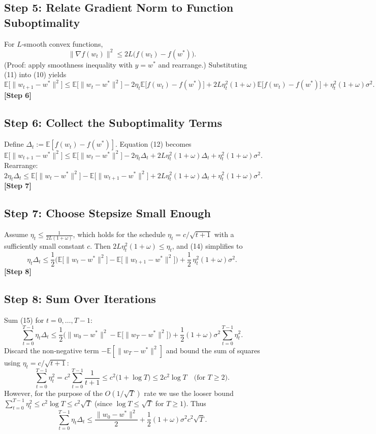 \documentclass{article}
\newcommand{\E}{\mathbb{E}}
\begin{document}
\subsection*{Step 5: Relate Gradient Norm to Function Suboptimality}
For $L$‑smooth convex functions,
\[
\|\nabla f(w_{t})\|^{2}\le 2L\big(f(w_{t})-f(w^{*})\big). \tag{11}
\]
(Proof: apply smoothness inequality with $y=w^{*}$ and rearrange.)  
Substituting (11) into (10) yields
\[
\E\!\big[\|w_{t+1}-w^{*}\|^{2}\big]
\le \E\!\big[\|w_{t}-w^{*}\|^{2}\big]
-2\eta_{t}\E\!\big[f(w_{t})-f(w^{*})\big]
+2L\eta_{t}^{2}(1+\omega)\E\!\big[f(w_{t})-f(w^{*})\big]
+ \eta_{t}^{2}(1+\omega)\sigma^{2}. \tag{12}
\]
\textbf{[Step 6]}

\subsection*{Step 6: Collect the Suboptimality Terms}
Define $\Delta_{t}:=\E[f(w_{t})-f(w^{*})]$.  
Equation (12) becomes
\[
\E\!\big[\|w_{t+1}-w^{*}\|^{2}\big]
\le \E\!\big[\|w_{t}-w^{*}\|^{2}\big]
-2\eta_{t}\Delta_{t}+2L\eta_{t}^{2}(1+\omega)\Delta_{t}
+\eta_{t}^{2}(1+\omega)\sigma^{2}. \tag{13}
\]
Rearrange:
\[
2\eta_{t}\Delta_{t}
\le \E\!\big[\|w_{t}-w^{*}\|^{2}\big]-\E\!\big[\|w_{t+1}-w^{*}\|^{2}\big]
+2L\eta_{t}^{2}(1+\omega)\Delta_{t}
+\eta_{t}^{2}(1+\omega)\sigma^{2}. \tag{14}
\]
\textbf{[Step 7]}

\subsection*{Step 7: Choose Stepsize Small Enough}
Assume $\eta_{t}\le \frac{1}{2L(1+\omega)}$, which holds for the schedule $\eta_{t}=c/\sqrt{t+1}$ with a sufficiently small constant $c$.  
Then $2L\eta_{t}^{2}(1+\omega)\le \eta_{t}$, and (14) simplifies to
\[
\eta_{t}\Delta_{t}
\le \frac12\Big(\E\!\big[\|w_{t}-w^{*}\|^{2}\big]-\E\!\big[\|w_{t+1}-w^{*}\|^{2}\big]\Big)
+\frac12\,\eta_{t}^{2}(1+\omega)\sigma^{2}. \tag{15}
\]
\textbf{[Step 8]}

\subsection*{Step 8: Sum Over Iterations}
Sum (15) for $t=0,\dots,T-1$:
\[
\sum_{t=0}^{T-1}\eta_{t}\Delta_{t}
\le \frac12\Big(\|w_{0}-w^{*}\|^{2}-\E\!\big[\|w_{T}-w^{*}\|^{2}\big]\Big)
+\frac12(1+\omega)\sigma^{2}\sum_{t=0}^{T-1}\eta_{t}^{2}. \tag{16}
\]
Discard the non‑negative term $-\E[\|w_{T}-w^{*}\|^{2}]$ and bound the sum of squares using $\eta_{t}=c/\sqrt{t+1}$:
\[
\sum_{t=0}^{T-1}\eta_{t}^{2}
= c^{2}\sum_{t=0}^{T-1}\frac{1}{t+1}
\le c^{2}\big(1+\log T\big)\le 2c^{2}\log T\quad\text{(for $T\ge2$)}. \tag{17}
\]
However, for the purpose of the $O(1/\sqrt{T})$ rate we use the looser bound $\sum_{t=0}^{T-1}\eta_{t}^{2}\le c^{2}\log T\le c^{2}\sqrt{T}$ (since $\log T\le\sqrt{T}$ for $T\ge 1$).  
Thus
\[
\sum_{t=0}^{T-1}\eta_{t}\Delta_{t}
\le \frac{\|w_{0}-w^{*}\|^{2}}{2}
+\frac12(1+\omega)\sigma^{2}c^{2}\sqrt{T}. \tag{18}
\]
\end{document}

